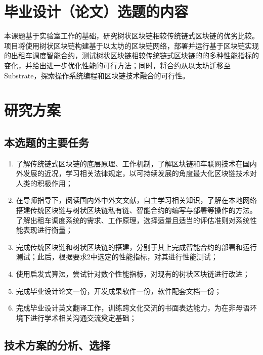 \documentclass[type=undergraduate_proposal]{bitreport}
\begin{document}
\MakeCover

\MakeReviewTable

\section{毕业设计（论文）选题的内容}
本课题基于实验室工作的基础，研究树状区块链相较传统链式区块链的优劣比较。项目将使用树状区块链构建基于以太坊的区块链网络，部署并运行基于区块链实现的出租车调度智能合约，测试树状区块链相较传统链式区块链的的多种性能指标的变化，并给出进一步优化性能的可行方法；同时，将合约从以太坊迁移至Substrate，探索操作系统编程和区块链技术融合的可行性。

\section{研究方案}
\subsection{本选题的主要任务}
\begin{enumerate}
  \item 了解传统链式区块链的底层原理、工作机制，了解区块链和车联网技术在国内外发展的近况\cite{blockchainCurrent}\cite{iov}，学习相关法律规定，以可持续发展的角度最大化区块链技术对人类的积极作用；
  \item 在导师指导下，阅读国内外中外文文献，自主学习相关知识，了解在本地网络搭建传统区块链与树状区块链私有链、智能合约的编写与部署等操作的方法。了解出租车调度系统的需求、工作原理，选择适量且适当的评估准则对系统性能表现进行衡量；
  \item 完成传统区块链和树状区块链的搭建，分别于其上完成智能合约的部署和运行测试；此后，根据要求2中选定的性能指标，对其进行性能测试；
  \item 使用启发式算法，尝试针对数个性能指标，对现有的树状区块链进行改进；
  \item 完成毕业设计论文一份，开发成果软件一份，软件配套文档一份；
  \item 完成毕业设计英文翻译工作，训练跨文化交流的书面表达能力，为在非母语环境下进行学术相关沟通交流奠定基础；
\end{enumerate}

\subsection{技术方案的分析、选择}

\end{document}
